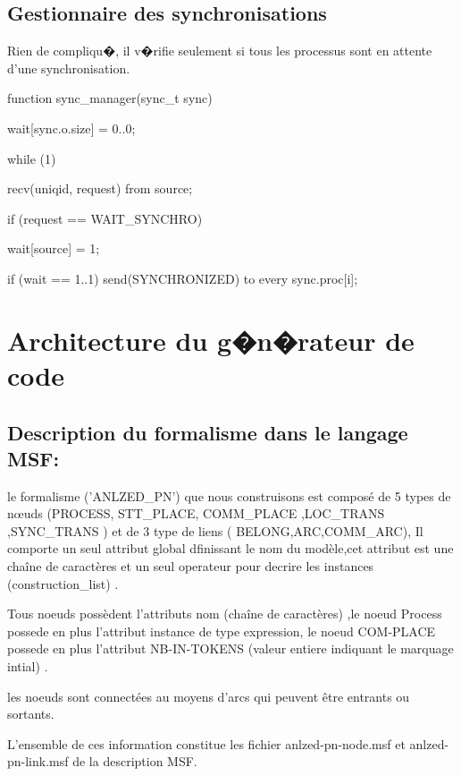 \documentclass[10pt,a4paper]{article}
\begin{document}
\subsection{Gestionnaire des synchronisations}

Rien de compliqu�, il v�rifie seulement si tous les processus sont
en attente d'une synchronisation.

\begin{codec}
function sync_manager(sync_t sync) {
  wait[sync.o.size] = {0..0};

  while (1) {
    recv(uniqid, request) from source;

    if (request == WAIT_SYNCHRO) {
      wait[source] = 1;

      if (wait == {1..1})
        send(SYNCHRONIZED) to every sync.proc[i];
    }
  }
}
\end{codec}


\section{Architecture du g�n�rateur de code}
\subsection {Description du formalisme dans le langage MSF:}

le formalisme  ('ANLZED_PN') que nous construisons est composé de 5 types de                 
nœuds (PROCESS, STT_PLACE, COMM_PLACE ,LOC_TRANS ,SYNC_TRANS ) et de 3 type de liens ( BELONG,ARC,COMM_ARC),
Il comporte un seul attribut global dfinissant le nom du modèle,cet attribut est une chaîne de caractères et un seul operateur pour decrire les instances
(construction_list) .

                                                                                         
Tous noeuds possèdent l'attributs nom (chaîne de caractères) ,le noeud Process possede en plus l'attribut instance de type expression,
le noeud COM-PLACE possede en plus l'attribut NB-IN-TOKENS (valeur entiere indiquant le marquage intial) .

les noeuds sont connectées au moyens d’arcs qui peuvent être entrants ou sortants.
                                                                                         
L’ensemble de ces information constitue les fichier anlzed-pn-node.msf et anlzed-pn-link.msf de la description MSF.    
\end{document}

